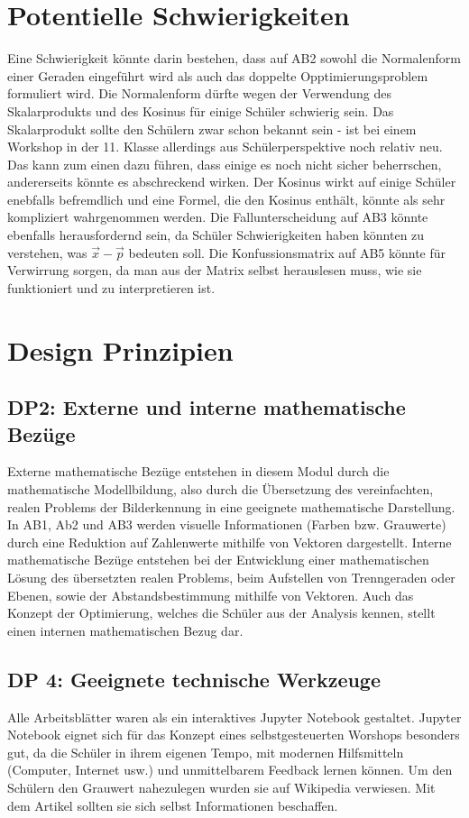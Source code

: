     \section{Potentielle Schwierigkeiten}
    Eine Schwierigkeit könnte darin bestehen, dass auf AB2 sowohl die Normalenform einer Geraden eingeführt wird als auch das doppelte Opptimierungsproblem formuliert wird. Die Normalenform dürfte wegen der Verwendung des Skalarprodukts und des Kosinus für einige Schüler schwierig sein. Das Skalarprodukt sollte den Schülern zwar schon bekannt sein - ist bei einem Workshop in der 11. Klasse allerdings aus Schülerperspektive noch relativ neu. Das kann zum einen dazu führen, dass einige es noch nicht sicher beherrschen, andererseits könnte es abschreckend wirken. Der Kosinus wirkt auf einige Schüler enebfalls befremdlich und eine Formel, die den Kosinus enthält, könnte als sehr kompliziert wahrgenommen werden.
    Die Fallunterscheidung auf AB3 könnte ebenfalls herausfordernd sein, da Schüler Schwierigkeiten haben könnten zu verstehen, was $\vec{x}-\vec{p}$ bedeuten soll. %
    Die Konfussionsmatrix auf AB5 könnte für Verwirrung sorgen, da man aus der Matrix selbst herauslesen muss, wie sie funktioniert und zu interpretieren ist.

    \section{Design Prinzipien}
       \subsection{DP2: Externe und interne mathematische Bezüge}
            Externe mathematische Bezüge entstehen in diesem Modul durch die mathematische Modellbildung, also durch die Übersetzung des vereinfachten, realen Problems der Bilderkennung in eine geeignete mathematische Darstellung.
            In AB1, Ab2 und AB3 werden visuelle Informationen (Farben bzw. Grauwerte) durch eine Reduktion auf Zahlenwerte mithilfe von Vektoren dargestellt.
            Interne mathematische Bezüge entstehen bei der Entwicklung einer mathematischen Lösung des übersetzten realen Problems, beim Aufstellen von Trenngeraden oder Ebenen, sowie der Abstandsbestimmung mithilfe von Vektoren.
            Auch das Konzept der Optimierung, welches die Schüler aus der Analysis kennen, stellt einen internen mathematischen Bezug dar.
        \subsection{DP 4: Geeignete technische Werkzeuge}
            Alle Arbeitsblätter waren als ein interaktives Jupyter Notebook gestaltet. Jupyter Notebook eignet sich für das Konzept eines selbstgesteuerten Worshops besonders gut, da die Schüler in ihrem eigenen Tempo, mit modernen Hilfsmitteln (Computer, Internet usw.) und unmittelbarem Feedback lernen können. Um den Schülern den Grauwert nahezulegen wurden sie auf Wikipedia verwiesen. Mit dem Artikel sollten sie sich selbst Informationen beschaffen.
